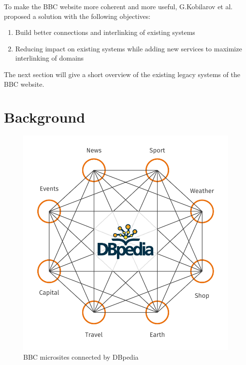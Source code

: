 \documentclass{llncs}
\begin{document}
\vspace{15mm}

To make the BBC website more coherent and more useful, G.Kobilarov et al. proposed a solution \cite{mmsw} with the following objectives:
\begin{enumerate}
  \item Build better connections and interlinking of existing systems
  \item Reducing impact on existing systems while adding new services to maximize interlinking of domains
\end{enumerate}

The next section will give a short overview of the existing legacy systems of the BBC website.

\section{Background}
%
\begin{figure}[!h]
  \includegraphics[width=\textwidth]{images/dbpedia_dark}
  \caption{BBC microsites connected by DBpedia}
  \label{fig:dbpedia}
\end{figure}
%
\end{document}
